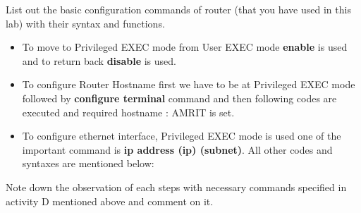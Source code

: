 \documentclass[a4paper,12pt]{article}
\begin{document}
\begin{Q}
      {
            List out the basic configuration commands of router (that you have used in this lab) with their syntax and functions.\\
      }
\end{Q}
\begin{itemize}
      \item To move to Privileged EXEC mode from User EXEC mode \textbf{enable} is used  and to return back \textbf{disable} is used.

      \item To configure Router Hostname  first we have to be at Privileged EXEC mode followed by \textbf{configure terminal} command and then following codes are executed and required hostname : AMRIT is set.
      \item To configure ethernet interface, Privileged EXEC mode is used one of the important command is \textbf{ip address (ip) (subnet)}. All other codes and syntaxes are mentioned below:
\end{itemize}



\begin{Q}
      {
            Note down the observation of each steps with necessary commands specified in activity D
            mentioned above and comment on it.
      }
\end{Q}
\end{document}
